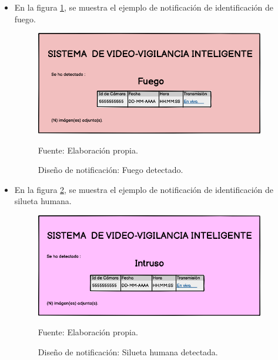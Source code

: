 \begin{itemize}
    \item En la figura \ref{fig:desing_fire_detection_notif}, se muestra el ejemplo de notificación de identificación de fuego.
    \begin{figure}[H]
        \begin{center}
            \includegraphics[width=10cm]{img/capitulo_4/fire_detection_mail.png}
        \end{center}
        \begin{center}
            \caption{Diseño de notificación: Fuego detectado.}
            Fuente: Elaboración propia.
            \label{fig:desing_fire_detection_notif}        
        \end{center}
    \end{figure}
    
    \item En la figura \ref{fig:desing_human_detection_notif}, se muestra el ejemplo de notificación de identificación de silueta humana.
    
    \begin{figure}[H]
        \begin{center}
            \includegraphics[width=10cm]{img/capitulo_4/human_detection_mail.png}
        \end{center}
        \begin{center}
            \caption{Diseño de notificación: Silueta humana detectada.}
            Fuente: Elaboración propia.
            \label{fig:desing_human_detection_notif}
        \end{center}
    \end{figure}    


\end{itemize}
